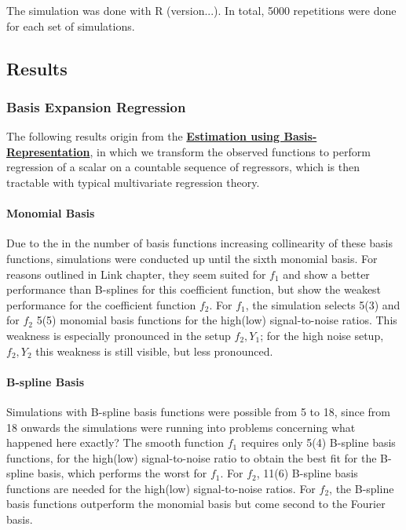 \documentclass[11pt,twoside,a4paper]{article}
\begin{document}
		 The simulation was done with R (version...). In total, 5000 repetitions were done for each set of simulations. 
		
	\subsection{Results}	
	
	\subsubsection{Basis Expansion Regression}
	The following results origin from the \hyperref[basis_exp_transf]{\textbf{Estimation using Basis-Representation}}, in which we transform the observed functions to perform regression of a scalar on a countable sequence of regressors, which is then tractable with typical multivariate regression theory. 
	
	\paragraph{Monomial Basis}
	Due to the in the number of basis functions increasing collinearity of these basis functions, simulations were conducted up until the sixth monomial basis. For reasons outlined in {\color{green} Link chapter}, they seem suited for $f_1$ and show a better performance than B-splines for this coefficient function, but show the weakest performance for the coefficient function $f_2$. For $f_1$, the simulation selects 5(3) and for $f_2$ 5(5) monomial basis functions for the high(low) signal-to-noise ratios. This weakness is especially pronounced in the setup $f_2,Y_1$; for the high noise setup, $f_2, Y_2$ this weakness is still visible, but less pronounced.
	
	\paragraph{B-spline Basis}
	Simulations with B-spline basis functions were possible from 5 to 18, since from 18 onwards the simulations were running into problems concerning {\color{green} what happened here exactly?}
	The smooth function $f_1$ requires only 5(4) B-spline basis functions, for the high(low) signal-to-noise ratio to obtain the best fit for the B-spline basis, which performs the worst for $f_1$. For $f_2$, 11(6) B-spline basis functions are needed for the high(low) signal-to-noise ratios. For $f_2$, the B-spline basis functions outperform the monomial basis but come second to the Fourier basis.
	
\end{document}
